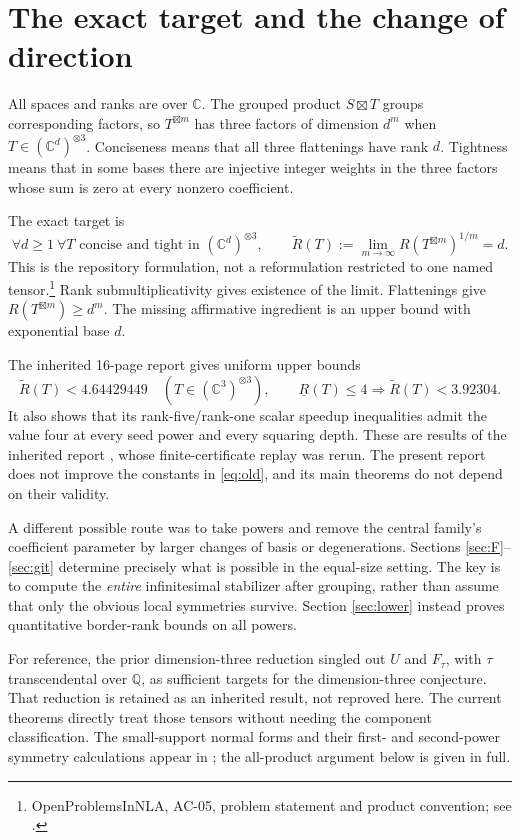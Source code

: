 \documentclass[11pt]{article}
\theoremstyle{remark}\newtheorem{remark}[theorem]{Remark}
\newcommand{\C}{\mathbb C}
\newcommand{\AR}{\widetilde R}
\newcommand{\BR}{\underline R}
\newcommand{\gp}{\boxtimes}
\begin{document}
\newpage
\tableofcontents
\newpage
\section{The exact target and the change of direction}
All spaces and ranks are over $\C$. The grouped product $S\gp T$ groups corresponding factors, so $T^{\gp m}$ has three factors of dimension $d^m$ when $T\in(\C^d)^{\otimes3}$. Conciseness means that all three flattenings have rank $d$. Tightness means that in some bases there are injective integer weights in the three factors whose sum is zero at every nonzero coefficient.

The exact target is
\begin{equation}\label{eq:target}
 \forall d\geq1\ \forall T\text{ concise and tight in }(\C^d)^{\otimes3},
 \qquad \AR(T):=\lim_{m\to\infty}R(T^{\gp m})^{1/m}=d.
\end{equation}
This is the repository formulation, not a reformulation restricted to one named tensor.\footnote{OpenProblemsInNLA, AC-05, problem statement and product convention; see \cite{repo}.} Rank submultiplicativity gives existence of the limit. Flattenings give $R(T^{\gp m})\geq d^m$. The missing affirmative ingredient is an upper bound with exponential base $d$.

The inherited 16-page report gives uniform upper bounds
\begin{equation}\label{eq:old}
 \AR(T)<4.64429449\quad(T\in(\C^3)^{\otimes3}),
 \qquad
 \BR(T)\leq4\Longrightarrow\AR(T)<3.92304.
\end{equation}
It also shows that its rank-five/rank-one scalar speedup inequalities admit the value four at every seed power and every squaring depth. These are results of the inherited report \cite{inherited}, whose finite-certificate replay was rerun. The present report does not improve the constants in \eqref{eq:old}, and its main theorems do not depend on their validity.

A different possible route was to take powers and remove the central family's coefficient parameter by larger changes of basis or degenerations. Sections \ref{sec:F}--\ref{sec:git} determine precisely what is possible in the equal-size setting. The key is to compute the \emph{entire} infinitesimal stabilizer after grouping, rather than assume that only the obvious local symmetries survive. Section \ref{sec:lower} instead proves quantitative border-rank bounds on all powers.

For reference, the prior dimension-three reduction singled out $U$ and $F_\tau$, with $\tau$ transcendental over $\mathbb Q$, as sufficient targets for the dimension-three conjecture. That reduction is retained as an inherited result, not reproved here. The current theorems directly treat those tensors without needing the component classification. The small-support normal forms and their first- and second-power symmetry calculations appear in \cite{cglv}; the all-product argument below is given in full.
\end{document}
